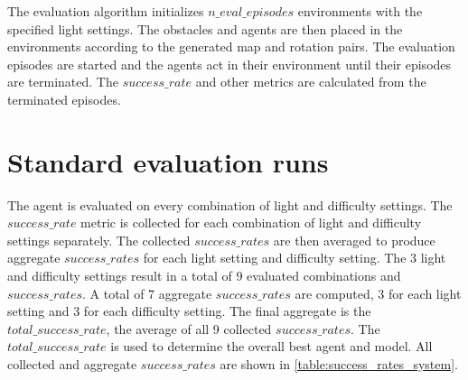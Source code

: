 The evaluation algorithm initializes $n\_eval\_episodes$ environments with the specified light settings. The obstacles and agents are then placed in the environments according to the generated map and rotation pairs. The evaluation episodes are started and the agents act in their environment until their episodes are terminated. The $success\_rate$ and other metrics are calculated from the terminated episodes.



\section{Standard evaluation runs}

The agent is evaluated on every combination of light and difficulty settings. The $success\_rate$ metric is collected for each combination of light and difficulty settings separately. The collected $success\_rates$ are then averaged to produce aggregate $success\_rates$ for each light setting and difficulty setting. The 3 light and difficulty settings result in a total of 9 evaluated combinations and $success\_rates$. A total of 7 aggregate $success\_rates$ are computed, 3 for each light setting and 3 for each difficulty setting. The final aggregate is the $total\_success\_rate$, the average of all 9 collected $success\_rates$. 
The $total\_success\_rate$ is used to determine the overall best agent and model.
All collected and aggregate $success\_rates$ are shown in \ref{table:success_rates_system}.

\begin{table}
\begin{center}
\end{center}
\caption{Collected and aggregate success\_rate metrics}
\label{table:success_rates_system}
\end{table}



